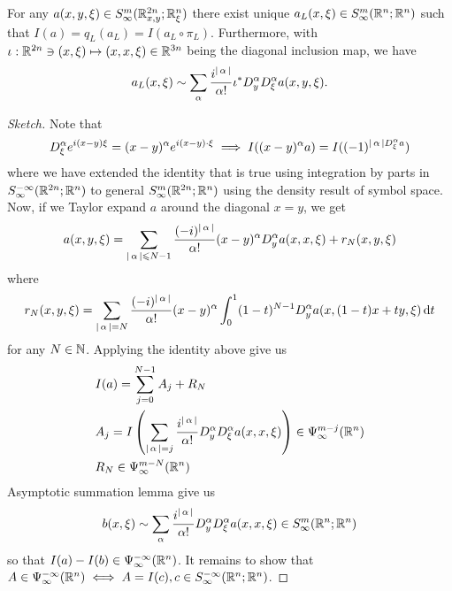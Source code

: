 \documentclass[12pt]{article}
\begin{document}
\begin{flemma}[Reduction] 
    For any $a(x, y, \xi) \in S^{m}_\infty(\R^{2n}_{x, y}; \R^n_\xi)$ there exist unique $a_L(x, \xi) \in S^{m}_\infty(\R^{n}; \R^n)$ such that $I(a) = q_L(a_L) = I(a_L \circ \pi_L)$. Furthermore, with $\iota : \R^{2n} \ni (x, \xi) \mapsto (x, x, \xi) \in \R^{3n}$ being the diagonal inclusion map, we have 
    \begin{align}
        a_L(x, \xi) \sim \sum_{\alpha} \frac{i^{\abs{\alpha}}}{\alpha !} \iota^* D^\alpha_y D^\alpha_\xi a(x, y, \xi). 
    \end{align}
\end{flemma}
\begin{proof}[Sketch] 
    Note that 
    \begin{align*}
        D_\xi^\alpha e^{i(x- y) \xi} = (x - y)^\alpha e^{i(x -y) \cdot \xi} \implies I((x -y)^\alpha a) = I((-1)^{\abs{\alpha}D_\xi^\alpha a})
    \end{align*}
    where we have extended the identity that is true using integration by parts in $S^{-\infty}_\infty(\R^{2n}; \R^n)$ to general $S^{m}_\infty(\R^{2n}; \R^n)$ using the density result of symbol space. Now, if we Taylor expand $a$ around the diagonal $x =y$, we get 
    \begin{align*}
        a(x, y, \xi) = \sum_{\abs{\alpha} \leq N -1} \frac{(-i)^{\abs{\alpha}}}{\alpha !} (x - y)^\alpha D^\alpha_ya (x, x, \xi) + r_N(x, y, \xi)
    \end{align*}
    where 
    \begin{align*}
        r_N(x, y, \xi) = \sum_{\abs{\alpha} = N} \frac{(-i)^{\abs{\alpha}}}{\alpha !} (x - y)^\alpha \int_0^1 (1 - t)^{N -1} D^\alpha_ya(x, (1 -t)x + ty, \xi) \d[t]
    \end{align*}
    for any $N \in \N$.  Applying the identity above give us 
    \begin{align*}
        &I(a) = \sum_{j = 0}^{N -1} A_j + R_N \\
        &A_j = I\brac{\sum_{\abs{\alpha} = j} \frac{i^{\abs{\alpha}}}{\alpha !} D^\alpha_y D^\alpha_\xi a (x, x, \xi)} \in \Psi^{m - j}_\infty(\R^n)\\
        &R_N \in \Psi^{m -N}_\infty(\R^n)
    \end{align*}
    Asymptotic summation lemma give us 
    \begin{align*}
        b(x, \xi) \sim \sum_{\alpha} \frac{i^{\abs{\alpha}}}{\alpha !} D^\alpha_y D^\alpha_\xi a (x, x, \xi) \in S^{m}_\infty(\R^{n}; \R^n)
    \end{align*}
    so that $I(a) - I(b) \in \Psi^{-\infty}_\infty(\R^n)$. It remains to show that $A \in \Psi^{-\infty}_\infty(\R^n) \iff A = I(c), c \in S^{-\infty}_\infty(\R^{n}; \R^n)$. 
\end{proof}
\end{document}
